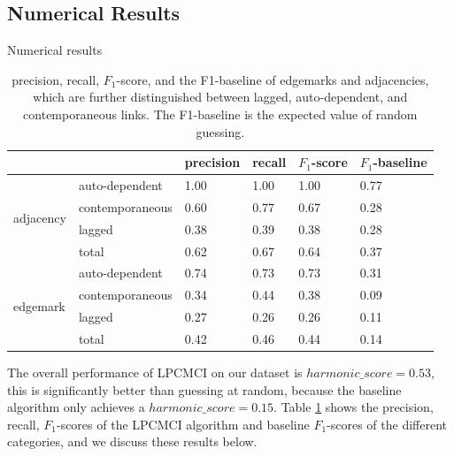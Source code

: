 \documentclass[conference]{IEEEtran}
\begin{document}
\subsection{Numerical Results}
\begin{table}[!htb]
\begin{center}
        \caption{Numerical results}
        \caption[]{precision, recall, $F_1$-score, and the F1-baseline of edgemarks and adjacencies, which are further distinguished between lagged, auto-dependent, and contemporaneous links. The F1-baseline is the expected value of random guessing.}
      \centering
        \begin{tabular}{@{}llllll@{}}
            \toprule
            \textbf{}                  & & precision        & recall  &  $F_1$-score & $F_1$-baseline    \\ \midrule
            \multirow{4}{*}{adjacency} & auto-dependent     & 1.00             & 1.00  &  1.00     & 0.77     \\
                                       & contemporaneous    & 0.60             & 0.77  &  0.67     & 0.28     \\
                                       & lagged             & 0.38             & 0.39  &  0.38     & 0.28     \\
                                       & total              & 0.62             & 0.67  &  0.64     & 0.37     \\ \midrule
            \multirow{4}{*}{edgemark}  & auto-dependent     & 0.74             & 0.73  &  0.73     & 0.31     \\
                                       & contemporaneous    & 0.34             & 0.44  &  0.38     & 0.09     \\
                                       & lagged             & 0.27             & 0.26  &  0.26     & 0.11      \\
                                       & total              & 0.42             & 0.46  &  0.44     & 0.14     \\ 
            \end{tabular}
            \label{tab:precision_recall}
    \end{center}
\end{table}
The overall performance of LPCMCI on our dataset is $harmonic\_score = 0.53$, this is significantly better than guessing at random, because the baseline algorithm only achieves a $harmonic\_score = 0.15$.
Table \ref{tab:precision_recall} shows the precision, recall, $F_1$-scores of the LPCMCI algorithm and baseline $F_1$-scores of the different categories, and we discuss these results below.
\end{document}

